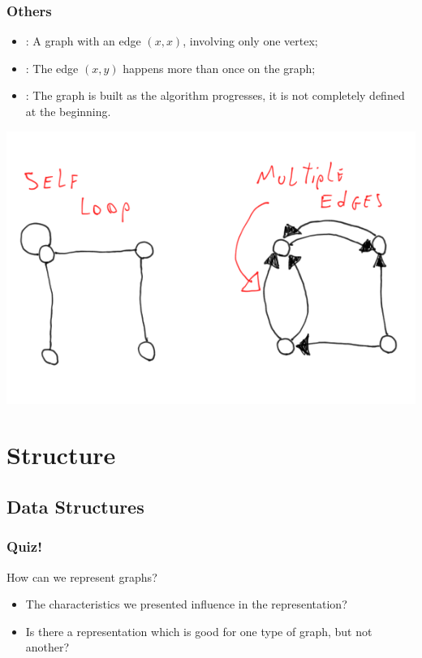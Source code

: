 \documentclass{beamer}
\begin{document}
\begin{frame}
  \frametitle{Others}
  \begin{itemize}
  \item {}: A graph with an edge $(x,x)$, involving only one vertex;
  \item {}: The edge $(x,y)$ happens more than once on the graph;
  \item {}: The graph is built as the algorithm
    progresses, it is not completely defined at the beginning.
  \end{itemize}
   \begin{center}
    \includegraphics[height=0.45\textheight]{nonnormal}
  \end{center}
\end{frame}

\section{Structure}
\subsection{Data Structures}
\begin{frame}
  \frametitle{Quiz!}
  \begin{block}{How can we represent graphs?}
    \begin{itemize}
    \item The characteristics we presented influence in the
      representation?
    \item Is there a representation which is good for one type of
      graph, but not another?
    \end{itemize}
  \end{block}
\end{frame}
\end{document}

